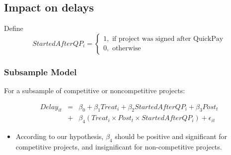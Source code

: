 \documentclass[
]{article}
\providecommand{\tightlist}{%
  \setlength{\itemsep}{0pt}\setlength{\parskip}{0pt}}
\begin{document}
\hypertarget{impact-on-delays}{%
\subsection{Impact on delays}\label{impact-on-delays}}

Define
\[ StartedAfterQP_i = \begin{cases} 1, \text{ if project was signed after QuickPay}\\
0, \text{ otherwise} \end{cases}\]

\hypertarget{subsample-model}{%
\subsubsection{Subsample Model}\label{subsample-model}}

For a subsample of competitive or noncompetitive projects:

\[ \begin{aligned} Delay_{it} &=& \beta_0 +\beta_1 Treat_i+ \beta_2 StartedAfterQP_i+ \beta_3 Post_t \\ &+& \beta_4 (Treat_i \times Post_t \times StartedAfterQP_i )+\epsilon_{it} \end{aligned} \]

\begin{itemize}
\tightlist
\item
  According to our hypothesis, \(\beta_4\) should be positive and
  significant for competitive projects, and insignificant for
  non-competitive projects.
\end{itemize}
\end{document}
